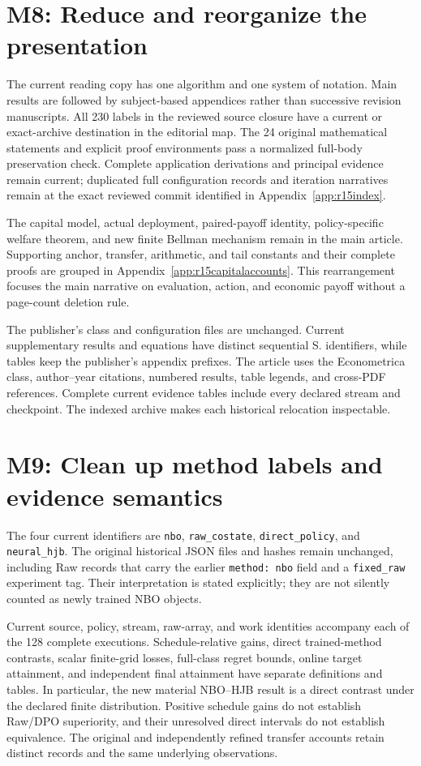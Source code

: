 \section*{M8: Reduce and reorganize the presentation}
The current reading copy has one algorithm and one system of notation. Main results are followed by subject-based appendices rather than successive revision manuscripts. All 230 labels in the reviewed source closure have a current or exact-archive destination in the editorial map. The 24 original mathematical statements and explicit proof environments pass a normalized full-body preservation check. Complete application derivations and principal evidence remain current; duplicated full configuration records and iteration narratives remain at the exact reviewed commit identified in Appendix~\ref{app:r15index}.

The capital model, actual deployment, paired-payoff identity, policy-specific welfare theorem, and new finite Bellman mechanism remain in the main article. Supporting anchor, transfer, arithmetic, and tail constants and their complete proofs are grouped in Appendix~\ref{app:r15capitalaccounts}. This rearrangement focuses the main narrative on evaluation, action, and economic payoff without a page-count deletion rule.

The publisher's class and configuration files are unchanged. Current supplementary results and equations have distinct sequential S. identifiers, while tables keep the publisher's appendix prefixes. The article uses the Econometrica class, author--year citations, numbered results, table legends, and cross-PDF references. Complete current evidence tables include every declared stream and checkpoint. The indexed archive makes each historical relocation inspectable.

\section*{M9: Clean up method labels and evidence semantics}
The four current identifiers are \texttt{nbo}, \texttt{raw\_costate}, \texttt{direct\_policy}, and \texttt{neural\_hjb}. The original historical JSON files and hashes remain unchanged, including Raw records that carry the earlier \texttt{method: nbo} field and a \texttt{fixed\_raw} experiment tag. Their interpretation is stated explicitly; they are not silently counted as newly trained NBO objects.

Current source, policy, stream, raw-array, and work identities accompany each of the 128 complete executions. Schedule-relative gains, direct trained-method contrasts, scalar finite-grid losses, full-class regret bounds, online target attainment, and independent final attainment have separate definitions and tables. In particular, the new material NBO--HJB result is a direct contrast under the declared finite distribution. Positive schedule gains do not establish Raw/DPO superiority, and their unresolved direct intervals do not establish equivalence. The original and independently refined transfer accounts retain distinct records and the same underlying observations.
